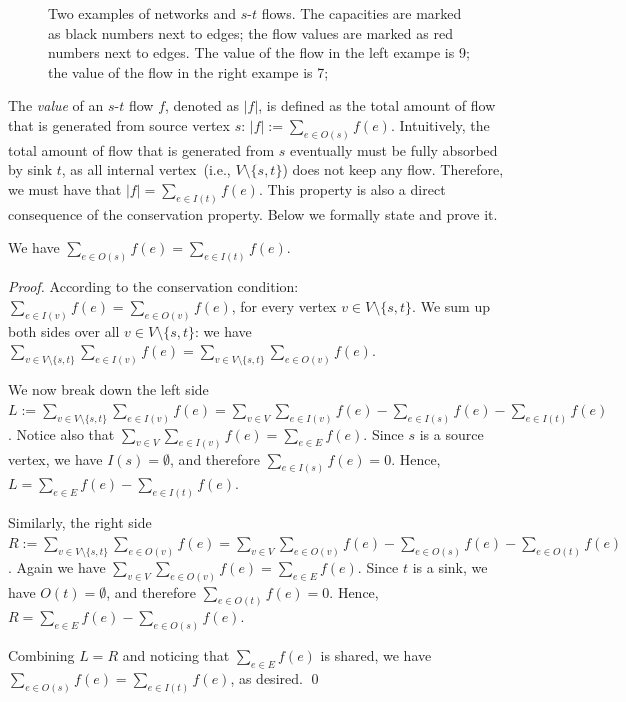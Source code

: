 \begin{figure}[h]
\centering{}
\caption{Two examples of networks and $s$-$t$ flows.
The capacities are marked as black numbers next to edges;
the flow values are marked as red numbers next to edges.
The value of the flow in the left exampe is 9;
the value of the flow in the right exampe is 7;}
\label{fig:flow}
\end{figure}

The \emph{value} of an $s$-$t$ flow $f$, denoted as $|f|$,
is defined as the total amount of flow that is generated from source vertex $s$:
$|f| := \sum_{e\in O(s)} f(e)$. Intuitively, the total amount of flow that is generated
from $s$ eventually must be fully absorbed by sink $t$, as all internal vertex~(i.e., $V\setminus\{s,t\}$)
does not keep any flow. Therefore, we must have that 
$|f| = \sum_{e\in I(t)} f(e)$.  
This property is also a direct consequence of the conservation property.
Below we formally state and prove it.

\begin{fact}
We have $\sum_{e\in O(s)} f(e) = \sum_{e\in I(t)} f(e)$. 
\end{fact}

\emph{Proof.} According to the conservation condition:
$\sum_{e\in I(v)} f(e) = \sum_{e\in O(v)} f(e)$, 
for every vertex $v\in V\setminus\{s,t\}$. 
We sum up both sides over all $v\in V\setminus\{s,t\}$: 
we have $\sum_{v\in V\setminus\{s,t\}} \sum_{e\in I(v)} f(e) = \sum_{v\in V\setminus\{s,t\}} \sum_{e\in O(v)} f(e)$. 

We now break down the left side 
$L := \sum_{v\in V\setminus\{s,t\}} \sum_{e\in I(v)} f(e) 
= \sum_{v\in V} \sum_{e\in I(v)} f(e) -  \sum_{e\in I(s)} f(e) - \sum_{e\in I(t)} f(e)$.
Notice also that $\sum_{v\in V} \sum_{e\in I(v)} f(e) = \sum_{e\in E} f(e)$.
Since $s$ is a source vertex, we have $I(s) = \emptyset$, and therefore $\sum_{e\in I(s)} f(e)  = 0$.
Hence, $L = \sum_{e\in E} f(e) - \sum_{e\in I(t)} f(e)$.

Similarly, the right side 
$R := \sum_{v\in V\setminus\{s,t\}} \sum_{e\in O(v)} f(e) 
= \sum_{v\in V} \sum_{e\in O(v)} f(e) -  \sum_{e\in O(s)} f(e) - \sum_{e\in O(t)} f(e)$.
Again we have $\sum_{v\in V} \sum_{e\in O(v)} f(e) = \sum_{e\in E} f(e)$.
Since $t$ is a sink, we have $O(t) = \emptyset$, and therefore $\sum_{e\in O(t)} f(e)  = 0$.
Hence, $R = \sum_{e\in E} f(e) - \sum_{e\in O(s)} f(e)$.

Combining $L = R$ and noticing that $\sum_{e\in E} f(e)$ is shared, we have $\sum_{e\in O(s)} f(e) = \sum_{e\in I(t)} f(e)$, as desired.  \qed

